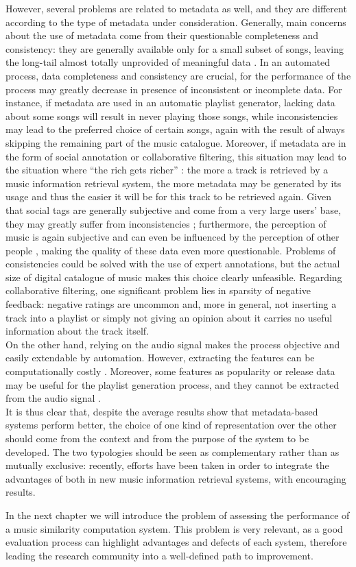 However, several problems are related to metadata as well, and they are different according to the type of metadata under consideration. Generally, main concerns about the use of metadata come from their questionable completeness and consistency: they are generally available only for a small subset of songs, leaving the long-tail almost totally unprovided of meaningful data \cite{celma2010}. In an automated process, data completeness and consistency are crucial, for the performance of the process may greatly decrease in presence of inconsistent or incomplete data. For instance, if metadata are used in an automatic playlist generator, lacking data about some songs will result in never playing those songs, while inconsistencies may lead to the preferred choice of certain songs, again with the result of always skipping the remaining part of the music catalogue. Moreover, if metadata are in the form of social annotation or collaborative filtering, this situation may lead to the situation where ``the rich gets richer'' \cite{bogdanov13}: the more a track is retrieved by a music information retrieval system, the more metadata may be generated by its usage and thus the easier it will be for this track to be retrieved again. Given that social tags are generally subjective and come from a very large users' base, they may greatly suffer from inconsistencies \cite{celma2010}; furthermore, the perception of music is again subjective and can even be influenced by the perception of other people \cite{mcdermott12}, making the quality of these data even more questionable. Problems of consistencies could be solved with the use of expert annotations, but the actual size of digital catalogue of music makes this choice clearly unfeasible. Regarding collaborative filtering, one significant problem lies in sparsity of negative feedback: negative ratings are uncommon and, more in general, not inserting a track into a playlist or simply not giving an opinion about it carries no useful information about the track itself. \\
On the other hand, relying on the audio signal makes the process objective and easily extendable by automation. However, extracting the features can be computationally costly \cite{schma13}. Moreover, some features as popularity or release data may be useful for the playlist generation process, and they cannot be extracted from the audio signal \cite{celma08}.\\
It is thus clear that, despite the average results show that metadata-based systems perform better, the choice of one kind of representation over the other should come from the context and from the purpose of the system to be developed. The two typologies should be seen as complementary rather than as mutually exclusive: recently, efforts have been taken in order to integrate the advantages of both in new music information retrieval systems, with encouraging results. 


In the next chapter we will introduce the problem of assessing the performance of a music similarity computation system. This problem is very relevant, as a good evaluation process can highlight advantages and defects of each system, therefore leading the research community into a well-defined path to improvement.